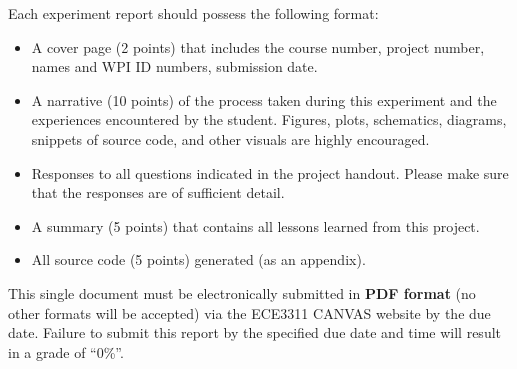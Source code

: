 \documentclass[letterpaper,12pt]{article}
\begin{document}
Each experiment report should possess the following format:
\begin{itemize}
 \item A cover page (2 points) that includes the course number, project number, names and WPI ID numbers, submission date.
 \item A narrative (10 points) of the process taken during this experiment and the experiences encountered by the student.  Figures, plots, schematics, diagrams, snippets of source code, and other visuals are highly encouraged.
 \item Responses to all questions indicated in the project handout.   Please make sure that the responses are of sufficient detail.
 \item A summary (5 points) that contains all lessons learned from this project.
 \item All source code (5 points) generated (as an appendix).
\end{itemize}

This single document must be electronically submitted in {\bf PDF format} (no other formats will be accepted) via the ECE3311 CANVAS website by the due date. Failure to submit this report by the specified due date and time will result in a grade of ``0\%''.
\end{document}
